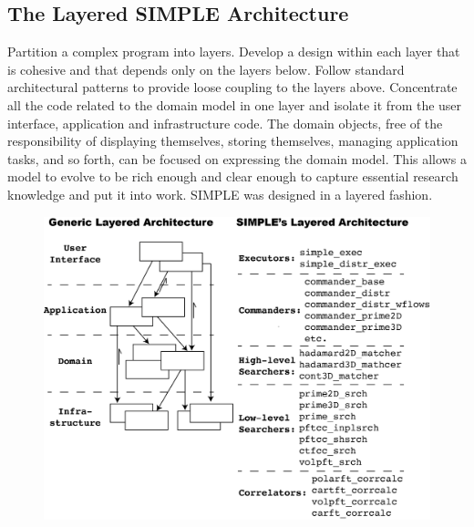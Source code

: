 \documentclass[a4paper,11pt]{article}
\begin{document}
\subsection{The Layered SIMPLE Architecture}
Partition a complex program into layers. Develop a design within each layer that is cohesive and that depends only on the layers below. Follow standard architectural patterns to provide loose coupling to the layers above. Concentrate all the code related to the domain model in one layer and isolate it from the user interface, application and infrastructure code. The domain objects, free of the responsibility of displaying themselves, storing themselves, managing application tasks, and so forth, can be focused on expressing the domain model. This allows a model to evolve to be rich enough and clear enough to capture essential research knowledge and put it into work. SIMPLE was designed in a layered fashion.
\begin{figure}
\includegraphics[keepaspectratio=true,scale=0.6]{./LayeredArch/layered_arch}
\end{figure}
\end{document}
